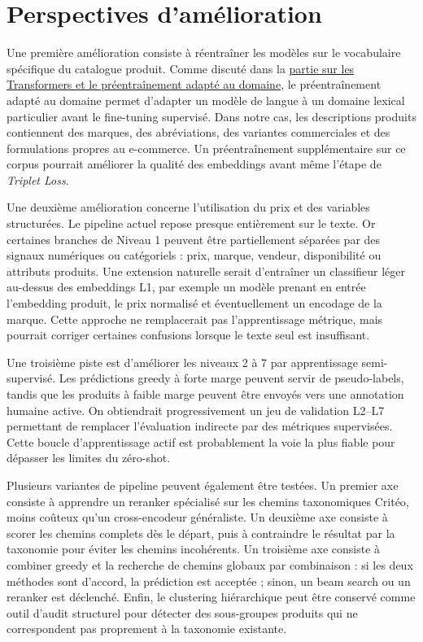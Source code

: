 \documentclass[12pt,a4paper]{report}
\begin{document}
\section{Perspectives d'amélioration}
\label{sec:conclusion-perspectives}

Une première amélioration consiste à réentraîner les modèles sur le vocabulaire spécifique du catalogue produit. Comme discuté dans la \hyperref[sec:lit-transformers]{partie sur les Transformers et le préentraînement adapté au domaine}, le préentraînement adapté au domaine permet d'adapter un modèle de langue à un domaine lexical particulier avant le fine-tuning supervisé. Dans notre cas, les descriptions produits contiennent des marques, des abréviations, des variantes commerciales et des formulations propres au e-commerce. Un préentraînement supplémentaire sur ce corpus pourrait améliorer la qualité des embeddings avant même l'étape de \textit{Triplet Loss}.

Une deuxième amélioration concerne l'utilisation du prix et des variables structurées. Le pipeline actuel repose presque entièrement sur le texte. Or certaines branches de Niveau 1 peuvent être partiellement séparées par des signaux numériques ou catégoriels : prix, marque, vendeur, disponibilité ou attributs produits. Une extension naturelle serait d'entraîner un classifieur léger au-dessus des embeddings L1, par exemple un modèle prenant en entrée l'embedding produit, le prix normalisé et éventuellement un encodage de la marque. Cette approche ne remplacerait pas l'apprentissage métrique, mais pourrait corriger certaines confusions lorsque le texte seul est insuffisant.

Une troisième piste est d'améliorer les niveaux 2 à 7 par apprentissage semi-supervisé. Les prédictions greedy à forte marge peuvent servir de pseudo-labels, tandis que les produits à faible marge peuvent être envoyés vers une annotation humaine active. On obtiendrait progressivement un jeu de validation L2--L7 permettant de remplacer l'évaluation indirecte par des métriques supervisées. Cette boucle d'apprentissage actif est probablement la voie la plus fiable pour dépasser les limites du zéro-shot.

Plusieurs variantes de pipeline peuvent également être testées. Un premier axe consiste à apprendre un reranker spécialisé sur les chemins taxonomiques Critéo, moins coûteux qu'un cross-encodeur généraliste. Un deuxième axe consiste à scorer les chemins complets dès le départ, puis à contraindre le résultat par la taxonomie pour éviter les chemins incohérents. Un troisième axe consiste à combiner greedy et la recherche de chemins globaux par combinaison : si les deux méthodes sont d'accord, la prédiction est acceptée ; sinon, un beam search ou un reranker est déclenché. Enfin, le clustering hiérarchique peut être conservé comme outil d'audit structurel pour détecter des sous-groupes produits qui ne correspondent pas proprement à la taxonomie existante.
\end{document}
